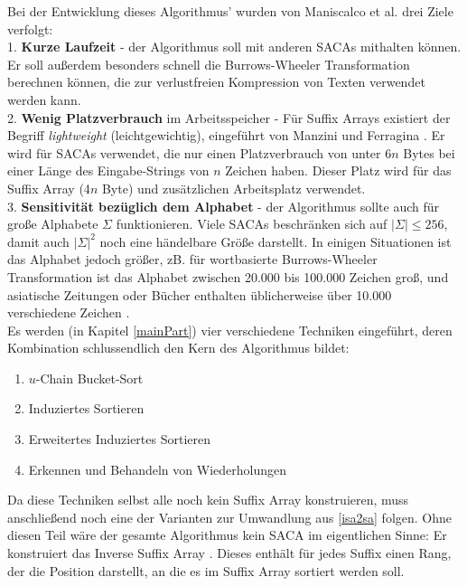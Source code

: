 Bei der Entwicklung dieses Algorithmus' wurden von Maniscalco et al. drei Ziele verfolgt:\\
1. \textbf{Kurze Laufzeit} - der Algorithmus soll mit anderen SACAs mithalten können. Er soll außerdem besonders schnell die Burrows-Wheeler Transformation \cite{BWT} berechnen können, die zur verlustfreien Kompression von Texten verwendet werden kann.\\
2. \textbf{Wenig Platzverbrauch} im Arbeitsspeicher - Für Suffix Arrays existiert der Begriff \textit{lightweight} (leichtgewichtig), eingeführt von Manzini und Ferragina \cite{saca:4}. Er wird für SACAs verwendet, die nur einen Platzverbrauch von unter 6$n$ Bytes bei einer Länge des Eingabe-Strings von $n$ Zeichen haben. Dieser Platz wird für das Suffix Array (4$n$ Byte) und zusätzlichen Arbeitsplatz verwendet.\\
3. \textbf{Sensitivität bezüglich dem Alphabet} - der Algorithmus sollte auch für große Alphabete $\Sigma$ funktionieren. Viele SACAs beschränken sich auf $|\Sigma| \leq 256$, damit auch $|\Sigma|^2$ noch eine händelbare Größe darstellt. In einigen Situationen ist das Alphabet jedoch größer, zB. für wortbasierte Burrows-Wheeler Transformation ist das Alphabet zwischen 20.000 bis 100.000 Zeichen groß, und asiatische Zeitungen oder Bücher enthalten üblicherweise über 10.000 verschiedene Zeichen \cite{asianAlphabets}.\\
Es werden (in Kapitel \ref{mainPart}) vier verschiedene Techniken eingeführt, deren Kombination schlussendlich den Kern des Algorithmus bildet:
\begin{enumerate}
\item $u$-Chain Bucket-Sort
\item Induziertes Sortieren
\item Erweitertes Induziertes Sortieren
\item Erkennen und Behandeln von Wiederholungen
\end{enumerate}
Da diese Techniken selbst alle noch kein Suffix Array konstruieren, muss anschließend noch eine der Varianten zur Umwandlung aus \ref{isa2sa} folgen. Ohne diesen Teil wäre der gesamte Algorithmus kein SACA im eigentlichen Sinne: Er konstruiert das Inverse Suffix Array \isa. Dieses enthält für jedes Suffix einen Rang, der die Position darstellt, an die es im Suffix Array sortiert werden soll.\\


